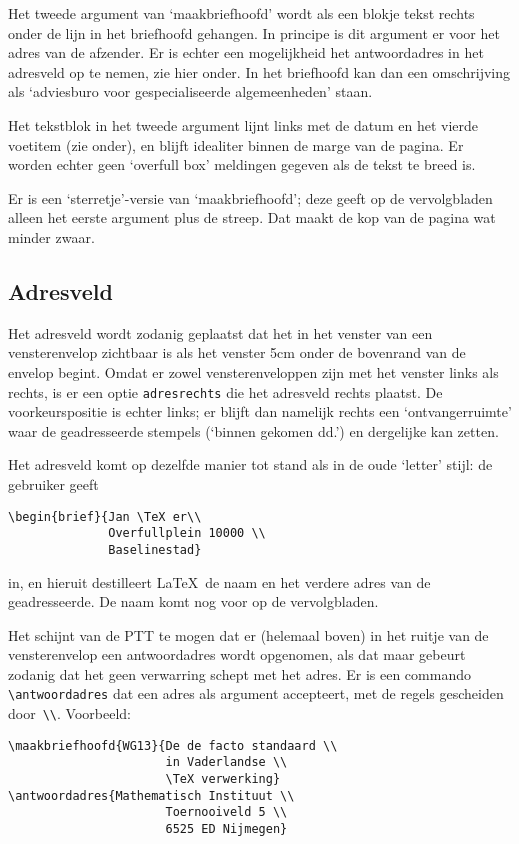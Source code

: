 \documentclass[a4paper,10pt]{artikel1}
\begin{document}
Het tweede argument van `maakbriefhoofd' wordt als een blokje tekst
rechts onder de lijn in het briefhoofd gehangen.  In principe is dit
argument er voor het adres van de afzender.  Er is echter een
mogelijkheid het antwoordadres in het adresveld op te nemen, zie hier
onder.  In het briefhoofd kan dan een omschrijving als `adviesburo
voor gespecialiseerde algemeenheden' staan.
 
Het tekstblok in het tweede argument lijnt links met de datum en het
vierde voetitem (zie onder), en blijft idealiter binnen de marge van
de pagina. Er worden echter geen `overfull box' meldingen gegeven als
de tekst te breed is.
 
Er is een `sterretje'-versie van `maakbriefhoofd'; deze geeft op de
vervolgbladen alleen het eerste argument plus de streep. Dat maakt de
kop van de pagina wat minder zwaar.
 
\subsection{Adresveld}
 
Het adresveld wordt zodanig geplaatst dat het in het venster van een
vensterenvelop zichtbaar is als het venster 5cm onder de bovenrand van
de envelop begint.  Omdat er zowel vensterenveloppen zijn met het
venster links als rechts, is er een optie \texttt{adresrechts} die het
adresveld rechts plaatst. De voorkeurspositie is echter links; er
blijft dan namelijk rechts een `ontvangerruimte' waar de geadresseerde
stempels (`binnen gekomen dd.') en dergelijke kan zetten.
 
Het adresveld komt op dezelfde manier tot stand als in de oude
`letter' stijl: de gebruiker geeft
\begin{verbatim}
\begin{brief}{Jan \TeX er\\
              Overfullplein 10000 \\
              Baselinestad}
\end{verbatim}
in, en hieruit destilleert \LaTeX\ de naam en het verdere adres van de
geadresseerde.  De naam komt nog voor op de vervolgbladen.
 
Het schijnt van de PTT te mogen dat er (helemaal boven) in het ruitje
van de vensterenvelop een antwoordadres wordt opgenomen, als dat maar
gebeurt zodanig dat het geen verwarring schept met het adres. Er is
een commando \verb.\antwoordadres.  dat een adres als argument
accepteert, met de regels gescheiden door~\verb.\\..  Voorbeeld:
\begin{verbatim}
\maakbriefhoofd{WG13}{De de facto standaard \\
                      in Vaderlandse \\
                      \TeX verwerking}
\antwoordadres{Mathematisch Instituut \\
                      Toernooiveld 5 \\
                      6525 ED Nijmegen}
\end{verbatim}
 
\end{document}
